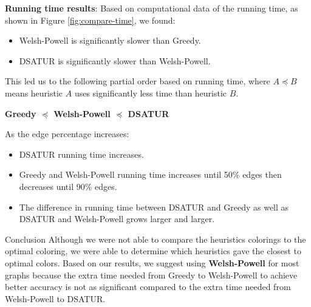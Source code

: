 \documentclass[final]{beamer}
\newlength{\onecolwid}
\begin{document}
\begin{frame}[t]
\begin{columns}[t]
\begin{column}{\onecolwid}
    \textbf{Running time results}: \newline
    Based on computational data of the running time, as shown in Figure \ref{fig:compare-time}, we found:
    \begin{itemize}
      \item Welsh-Powell is significantly slower than Greedy.
      \item DSATUR is significantly slower than Welsh-Powell.
    \end{itemize}
    This led us to the following partial order based on running time, where $A \preceq B$ means heuristic $A$ uses significantly less time than heuristic $B$.
    \begin{center}
      \textbf{Greedy $\preceq$ Welsh-Powell $\preceq$ DSATUR}
    \end{center}
    As the edge percentage increases:
    \begin{itemize}
      \item DSATUR running time increases.
      \item Greedy and Welsh-Powell running time increases until 50\% edges then decreases until 90\% edges.
      \item The difference in running time between DSATUR and Greedy as well as DSATUR and Welsh-Powell grows larger and larger.
    \end{itemize}


    \begin{block}{Conclusion}
      Although we were not able to compare the heuristics colorings to the optimal coloring, we were able to determine which heuristics gave the closest to optimal colors. Based on our results, we suggest using \textbf{Welsh-Powell} for most graphs because the extra time needed from Greedy to Welsh-Powell to achieve better accuracy is not as significant compared to the extra time needed from Welsh-Powell to DSATUR.
    \end{block}


\end{column}
\end{columns}
\end{frame}
\end{document}
